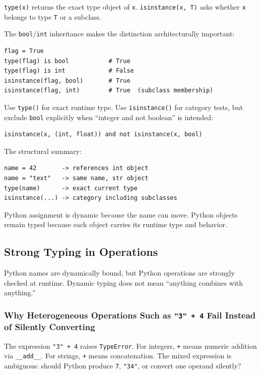 \documentclass[a4paper,twoside]{report}
\begin{document}
\texttt{type(x)} returns the exact type object of \texttt{x}. \texttt{isinstance(x, T)} asks whether \texttt{x} belongs to type \texttt{T} or a subclass.

The \texttt{bool}/\texttt{int} inheritance makes the distinction architecturally important:

\begin{verbatim}
flag = True
type(flag) is bool           # True
type(flag) is int            # False
isinstance(flag, bool)       # True
isinstance(flag, int)        # True  (subclass membership)
\end{verbatim}

Use \texttt{type()} for exact runtime type. Use \texttt{isinstance()} for category tests, but exclude \texttt{bool} explicitly when ``integer and not boolean'' is intended:

\begin{verbatim}
isinstance(x, (int, float)) and not isinstance(x, bool)
\end{verbatim}

The structural summary:

\begin{verbatim}
name = 42       -> references int object
name = "text"   -> same name, str object
type(name)      -> exact current type
isinstance(...) -> category including subclasses
\end{verbatim}

Python assignment is dynamic because the name can move. Python objects remain typed because each object carries its runtime type and behavior.


\subsection{Strong Typing in Operations}

Python names are dynamically bound, but Python operations are strongly checked at runtime. Dynamic typing does not mean ``anything combines with anything.''

\subsubsection{Why Heterogeneous Operations Such as \texttt{"3" + 4} Fail Instead of Silently Converting}

The expression \texttt{"3" + 4} raises \texttt{TypeError}. For integers, \texttt{+} means numeric addition via \texttt{\_\_add\_\_}. For strings, \texttt{+} means concatenation. The mixed expression is ambiguous: should Python produce \texttt{7}, \texttt{"34"}, or convert one operand silently?
\end{document}
